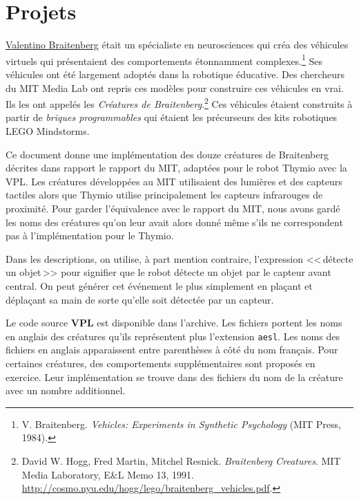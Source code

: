 \part{Projets}



\href{http://fr.wikipedia.org/wiki/Valentino_Braitenberg}{Valentino Braitenberg}
était un spécialiste en neurosciences qui créa des véhicules virtuels
qui présentaient des comportements étonnamment complexes.\footnote{V. Braitenberg.
\textit{Vehicles: Experiments in Synthetic Psychology} (MIT Press, 1984).}
Ses véhicules ont été largement adoptés dans la robotique éducative.
Des chercheurs du MIT Media Lab ont repris ces modèles pour construire ces véhicules en vrai.
Ils les ont appelés les \emph{Créatures de Braitenberg}.\footnote{David W. Hogg, Fred Martin,
Mitchel Resnick. \textit{Braitenberg Creatures}. MIT Media Laboratory, E\&L Memo 13, 1991.
\href{http://cosmo.nyu.edu/hogg/lego/braitenberg_vehicles.pdf}{http://cosmo.nyu.edu/hogg/lego/braitenberg\_vehicles.pdf}.}
Ces véhicules étaient construits à partir de \emph{briques programmables} qui étaient les
précurseurs des kits robotiques LEGO Mindstorms.

Ce document donne une implémentation des douze créatures de Braitenberg décrites dans
rapport le rapport du MIT, adaptées pour le robot Thymio avec la VPL.
Les créatures développées au MIT utilisaient des lumières et des capteurs tactiles
alors que Thymio utilise principalement les capteurs infrarouges de proximité.
Pour garder l'équivalence avec le rapport du MIT, nous avons gardé les noms des créatures
qu'on leur avait alors donné même s'ils ne correspondent pas à l'implémentation pour le Thymio.

Dans les descriptions, on utilise, à part mention contraire,
l'expression <<\,détecte un objet\,>> pour signifier
que le robot détecte un objet par le capteur avant central.
On peut générer cet événement le plus simplement en plaçant et déplaçant sa main
de sorte qu'elle soit détectée par un capteur.

Le code source \textbf{VPL} est disponible dans l'archive.
Les fichiers portent les noms en anglais des créatures qu'ils représentent
plus l'extension \texttt{\small aesl}.
Les noms des fichiers en anglais apparaissent entre parenthèses à côté du nom français.
Pour certaines créatures, des comportements supplémentaires sont proposés en exercice.
Leur implémentation se trouve dans des fichiers du nom de la créature avec un nombre additionnel.

